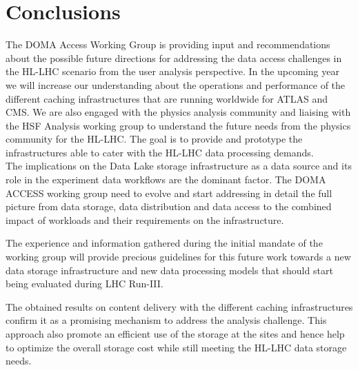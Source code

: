 \section{Conclusions}
The DOMA Access Working Group is providing input and recommendations about the possible future directions for addressing the data access challenges in the HL-LHC scenario from the user analysis perspective. In the upcoming year we will increase our understanding about the operations and performance of the different caching infrastructures that are running worldwide for ATLAS and CMS. We are also engaged with the physics analysis community and liaising with the HSF Analysis working group to understand the future needs from the physics community for the HL-LHC. The goal is to provide and prototype the infrastructures able to cater with the HL-LHC data processing demands.\\

The implications on the Data Lake storage infrastructure as a data source and its role in the experiment data workflows are the dominant factor. The DOMA ACCESS working group need to evolve and start addressing in detail the full picture from data storage, data distribution and data access to the combined impact of workloads and their requirements on the infrastructure.

 The experience and information gathered during the initial mandate of the working group will provide precious guidelines for this future work towards a new data storage infrastructure and new data processing models that should start being evaluated during LHC Run-III.
 
 The obtained results on content delivery with the different caching infrastructures confirm it as a promising mechanism to address the analysis challenge. This approach also promote an efficient use of the storage at the sites and hence help to optimize the overall storage cost while still meeting the HL-LHC data storage needs. 

